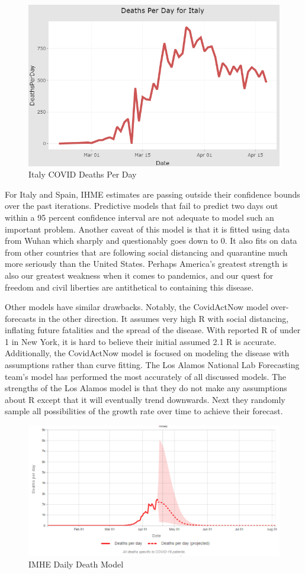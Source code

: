  
 \begin{figure}[H]
\centerline{\includegraphics[scale=0.30]{Figures/newplot.png}}
\caption{Italy COVID Deaths Per Day}
\label{m4}
\end{figure}


For Italy and Spain, IHME estimates are passing outside their confidence bounds over the past iterations.  Predictive models that fail to predict two days out within a 95 percent confidence interval are not adequate to model such an important problem. Another caveat of this model is that it is fitted using data from Wuhan which sharply and questionably goes down to 0.  It also fits on data from other countries that are following social distancing and quarantine much more seriously than the United States. Perhaps America's greatest strength is also our greatest weakness when it comes to pandemics, and our quest for freedom and civil liberties are antithetical to containing this disease.
 
 Other models have similar drawbacks.  Notably, the CovidActNow model over-forecasts in the other direction.  It assumes very high R with social distancing, inflating future fatalities and the spread of the disease.  With reported R of under 1 in New York, it is hard to believe their initial assumed 2.1 R is accurate.  Additionally, the CovidActNow model is focused on modeling the disease with assumptions rather than curve fitting.  The Los Alamos National Lab Forecasting team's model has performed the most accurately of all discussed models.  The strengths of the Los Alamos model is that they do not make any assumptions about R except that it will eventually trend downwards. Next they randomly sample all possibilities of the growth rate over time to achieve their forecast.  
 
 \begin{figure}[H]
\centerline{\includegraphics[scale=0.35]{Figures/2.PNG}}
\caption{IMHE Daily Death Model}
\label{m4}
\end{figure}
